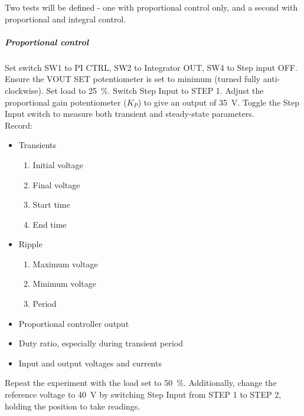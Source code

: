 Two tests will be defined - one with proportional control only, and a second with proportional and integral control.
\subparagraph{Proportional control}
Set switch SW1 to PI CTRL, SW2 to Integrator OUT, SW4 to Step input OFF. Ensure the VOUT SET potentiometer is set to minimum (turned
fully anti-clockwise). Set load to \qty{25}{\percent}. Switch Step Input to STEP 1. Adjust the proportional gain potentiometer ($K_P$)
to give an output of \qty{35}{\V}. Toggle the Step Input switch to measure both transient and steady-state parameters.\\
Record:
\begin{itemize}
    \item Transients
          \begin{enumerate}
              \item Initial voltage
              \item Final voltage
              \item Start time
              \item End time
          \end{enumerate}
    \item Ripple
          \begin{enumerate}
              \item Maximum voltage
              \item Minimum voltage
              \item Period
          \end{enumerate}
    \item Proportional controller output
    \item Duty ratio, especially during transient period
    \item Input and output voltages and currents
\end{itemize}

Repeat the experiment with the load set to \qty{50}{\percent}. Additionally, change the reference voltage to \qty{40}{\volt} by switching
Step Input from STEP 1 to STEP 2, holding the position to take readings.

